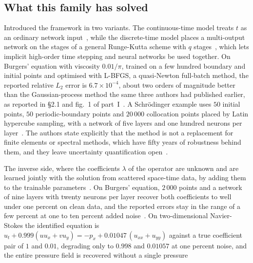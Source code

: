 \documentclass[11pt, a4paper]{article}
\begin{document}
\subsection{What this family has solved}

\begin{description}[style=nextline]
  \item[Raissi, Perdikaris and Karniadakis, part I~\citep{raissi1}]
  Introduced the framework in two variants. The continuous-time model treats
  $t$ as an ordinary network input~\citep[\S{}2]{raissi1}, while the
  discrete-time model places a multi-output network on the stages of a
  general Runge-Kutta scheme with $q$ stages~\citep[\S{}3,
  eqs.~(7)--(11)]{raissi1}, which lets implicit high-order time stepping and
  neural networks be used together. On Burgers' equation with viscosity
  $0.01/\pi$, trained on a few hundred boundary and initial points and
  optimised with L-BFGS, a quasi-Newton full-batch method, the reported
  relative $L_2$ error is $6.7 \times 10^{-4}$, about two orders of
  magnitude better than the Gaussian-process method the same three authors
  had published earlier, as reported in \S{}2.1 and fig.~1 of
  part~I~\citep{raissi1}. A Schr\"odinger example uses $50$
  initial points, $50$ periodic-boundary points and $20\,000$ collocation
  points placed by Latin hypercube sampling, with a network of five layers
  and one hundred neurons per layer~\citep[\S{}2.2]{raissi1}. The authors state
  explicitly that the method is not a replacement for finite elements or
  spectral methods, which have fifty years of robustness behind them, and
  they leave uncertainty quantification open~\citep[\S{}4]{raissi1}.
  \item[Part II~\citep{raissi2}]
  The inverse side, where the coefficients $\lambda$ of the operator are
  unknown and are learned jointly with the solution from scattered
  space-time data, by adding them to the trainable
  parameters~\citep[eq.~(5)]{raissi2}. On Burgers' equation, $2\,000$ points
  and a network of nine layers with twenty neurons per layer recover both
  coefficients to well under one percent on clean data, and the reported
  errors stay in the range of a few percent at one to ten percent added
  noise~\citep[Tables~1--2]{raissi2}. On two-dimensional Navier-Stokes the
  identified equation is $u_t + 0.999(u u_x + v u_y) = -p_x +
  0.01047\,(u_{xx} + u_{yy})$ against a true coefficient pair of $1$ and
  $0.01$, degrading only to $0.998$ and $0.01057$ at one percent noise, and
  the entire pressure field is recovered without a single pressure

\end{description}
\end{document}
